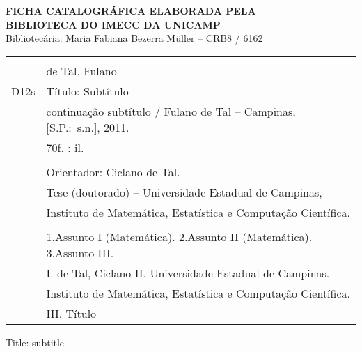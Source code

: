 \begin{titlepage}
\newpage

\thispagestyle{plain}
{

\begin{center}
{ \sffamily \Large \textbf{FICHA CATALOGR\'AFICA ELABORADA PELA\\ BIBLIOTECA DO IMECC
DA UNICAMP}} \\
Bibliotec\'aria: Maria Fabiana Bezerra M\"uller -- CRB8 / 6162 \\[1cm]
\end{center}

\begin{center}

\begin{tabular}{|cl|} \hline
  \hspace{1.3cm} & \\
  & de Tal, Fulano  \\
  \hspace{0.2cm} D12s & \hspace{0.6cm} T\'itulo: Subt\'itulo  \\ 
  &  continua\c{c}\~ao subt\'itulo / Fulano de Tal --
  Campinas,  [S.P.:~s.n.], 2011. \\
  & \hspace{0.65cm} 70f. : il. \\
  & \\
  & \hspace{0.6cm} Orientador: Ciclano de Tal.\\
  & \hspace{0.6cm} Tese (doutorado) -- 
Universidade Estadual de Campinas, \\
  & Instituto de Matem\'atica, Estat\'istica e Computa\c{c}\~ao
  Cient\'ifica.\\ 
  & \\
  & \hspace{0.6cm} 1.Assunto I (Matem\'atica). 2.Assunto II (Matem\'atica).  
  3.Assunto III.  \\ 
  & I. de Tal, Ciclano   \hspace{0.1cm} II. Universidade Estadual de
Campinas.  \\
  & Instituto
  de Matem\'atica, Estat\'istica e Computa\c{c}\~ao Cient\'ifica. \\   
  &  III. T\'itulo \\
  \hline
\end{tabular}
\end{center}
}\vfill
\doublespacing


 Title: subtitle


\end{titlepage}
